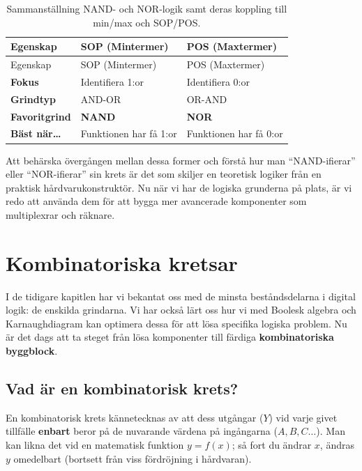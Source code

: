 \documentclass[
  swedish,
  letterpaper,
  oneside,
  openany]{book}
\begin{document}
\begin{longtable}[]{@{}lll@{}}
\caption{Sammanställning NAND- och NOR-logik samt deras koppling till
min/max och SOP/POS.}\label{tbl-NAND_NOR_summary}\tabularnewline
\toprule\noalign{}
Egenskap & SOP (Mintermer) & POS (Maxtermer) \\
\midrule\noalign{}
\endfirsthead
\toprule\noalign{}
Egenskap & SOP (Mintermer) & POS (Maxtermer) \\
\midrule\noalign{}
\endhead
\bottomrule\noalign{}
\endlastfoot
\textbf{Fokus} & Identifiera 1:or & Identifiera 0:or \\
\textbf{Grindtyp} & AND-OR & OR-AND \\
\textbf{Favoritgrind} & \textbf{NAND} & \textbf{NOR} \\
\textbf{Bäst när\ldots{}} & Funktionen har få 1:or & Funktionen har få
0:or \\
\end{longtable}

Att behärska övergången mellan dessa former och förstå hur man
``NAND-ifierar'' eller ``NOR-ifierar'' sin krets är det som skiljer en
teoretisk logiker från en praktisk hårdvarukonstruktör. Nu när vi har de
logiska grunderna på plats, är vi redo att använda dem för att bygga mer
avancerade komponenter som multiplexrar och räknare.


\chapter{Kombinatoriska kretsar}\label{sec-kombinatoriska-kretsar}

I de tidigare kapitlen har vi bekantat oss med de minsta beståndsdelarna
i digital logik: de enskilda grindarna. Vi har också lärt oss hur vi med
Boolesk algebra och Karnaughdiagram kan optimera dessa för att lösa
specifika logiska problem. Nu är det dags att ta steget från lösa
komponenter till färdiga \textbf{kombinatoriska byggblock}.

\section{Vad är en kombinatorisk
krets?}\label{sec-vad-ar-kombinatoriska-kretsar}

En kombinatorisk krets kännetecknas av att dess utgångar (\(Y\)) vid
varje givet tillfälle \textbf{enbart} beror på de nuvarande värdena på
ingångarna (\(A, B, C \dots\)). Man kan likna det vid en matematisk
funktion \(y = f(x)\); så fort du ändrar \(x\), ändras \(y\) omedelbart
(bortsett från viss fördröjning i hårdvaran).
\end{document}

